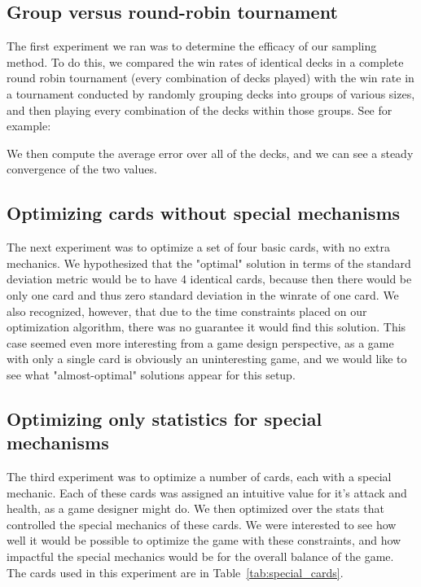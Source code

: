 \subsection{Group versus round-robin tournament}

The first experiment we ran was to determine the efficacy of our sampling method. To do this, we compared the win rates of identical decks in a complete round robin tournament (every combination of decks played) with the win rate in a tournament conducted by randomly grouping decks into groups of various sizes, and then playing every combination of the decks within those groups. See for example:


We then compute the average error over all of the decks, and we can see a steady convergence of the two values.


 \subsection{Optimizing cards without special mechanisms}

The next experiment was to optimize a set of four basic cards, with no extra mechanics. We hypothesized that the "optimal" solution in terms of the standard deviation metric would be to have 4 identical cards, because then there would be only one card and thus zero standard deviation in the winrate of one card. We also recognized, however, that due to the time constraints placed on our optimization algorithm, there was no guarantee it would find this solution. This case seemed even more interesting from a game design perspective, as a game with only a single card is obviously an uninteresting game, and we would like to see what "almost-optimal" solutions appear for this setup.

 \subsection{Optimizing only statistics for special mechanisms}

The third experiment was to optimize a number of cards, each with a special mechanic. Each of these cards was assigned an intuitive value for it's attack and health, as a game designer might do. We then optimized over the stats that controlled the special mechanics of these cards. We were interested to see how well it would be possible to optimize the game with these constraints, and how impactful the special mechanics would be for the overall balance of the game. The cards used in this experiment are in Table~\ref{tab:special_cards}.

